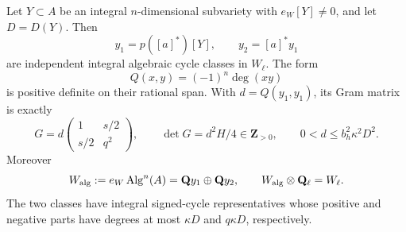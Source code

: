 \begin{proposition}
Let $Y\subset A$ be an integral $n$-dimensional subvariety with
$e_W[Y]\ne0$, and let $D=D(Y)$.  Then
\[
 y_1=p([a]^*)[Y],\qquad y_2=[a]^*y_1
\]
are independent integral algebraic cycle classes in $W_\ell$.
The form
\[
 Q(x,y)=(-1)^n\deg(xy)
\]
is positive definite on their rational span.  With $d=Q(y_1,y_1)$,
its Gram matrix is exactly
\begin{equation}\label{c44:weil-gram}
 G=d\begin{pmatrix}1&s/2\\s/2&q^2\end{pmatrix},\qquad
 \det G=d^2H/4\in\mathbf Z_{>0},\qquad
 0<d\leq b_h^2\kappa^2D^2.
\end{equation}
Moreover
\[
 W_{\rm alg}:=e_W\operatorname{Alg}^n(A)
    =\mathbf Qy_1\oplus\mathbf Qy_2,
 \qquad W_{\rm alg}\otimes\mathbf Q_\ell=W_\ell.
\]
The two classes have integral signed-cycle representatives whose
positive and negative parts have degrees at most $\kappa D$ and
$q\kappa D$, respectively.
\end{proposition}

